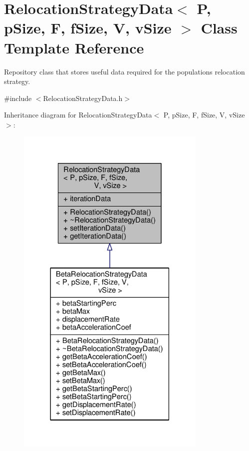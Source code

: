 \hypertarget{structRelocationStrategyData}{}\section{Relocation\+Strategy\+Data$<$ P, p\+Size, F, f\+Size, V, v\+Size $>$ Class Template Reference}
\label{structRelocationStrategyData}


Repository class that stores useful data required for the population\textquotesingle{}s relocation strategy.  




{\ttfamily \#include $<$Relocation\+Strategy\+Data.\+h$>$}



Inheritance diagram for Relocation\+Strategy\+Data$<$ P, p\+Size, F, f\+Size, V, v\+Size $>$\+:
\nopagebreak
\begin{figure}[H]
\begin{center}
\leavevmode
\includegraphics[width=258pt]{structRelocationStrategyData__inherit__graph}
\end{center}
\end{figure}


